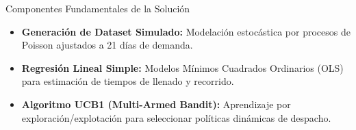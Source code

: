 \begin{summarybox}{Componentes Fundamentales de la Solución}
	\begin{itemize}
		\item \textbf{Generación de Dataset Simulado:} Modelación estocástica por procesos de Poisson ajustados a 21 días de demanda.
		\item \textbf{Regresión Lineal Simple:} Modelos Mínimos Cuadrados Ordinarios (OLS) para estimación de tiempos de llenado y recorrido.
		\item \textbf{Algoritmo UCB1 (Multi-Armed Bandit):} Aprendizaje por exploración/explotación para seleccionar políticas dinámicas de despacho.
	\end{itemize}
\end{summarybox}

\newpage
